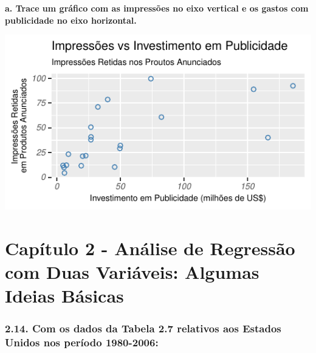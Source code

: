 \documentclass[
  11pt,
  a4paper,
]{article}
\begin{document}
\newpage

\textbf{a. Trace um gráfico com as impressões no eixo vertical e os gastos com publicidade no eixo horizontal.}

\begin{center}\includegraphics{article_files/figure-latex/unnamed-chunk-10-1} \end{center}

\newpage

\hypertarget{capuxedtulo-2---anuxe1lise-de-regressuxe3o-com-duas-variuxe1veis-algumas-ideias-buxe1sicas}{%
\section{Capítulo 2 - Análise de Regressão com Duas Variáveis: Algumas Ideias Básicas}\label{capuxedtulo-2---anuxe1lise-de-regressuxe3o-com-duas-variuxe1veis-algumas-ideias-buxe1sicas}}

\hypertarget{com-os-dados-da-tabela-2.7-relativos-aos-estados-unidos-nos-peruxedodo-1980-2006}{%
\subsubsection{2.14. Com os dados da Tabela 2.7 relativos aos Estados Unidos nos período 1980-2006:}\label{com-os-dados-da-tabela-2.7-relativos-aos-estados-unidos-nos-peruxedodo-1980-2006}}
\end{document}
